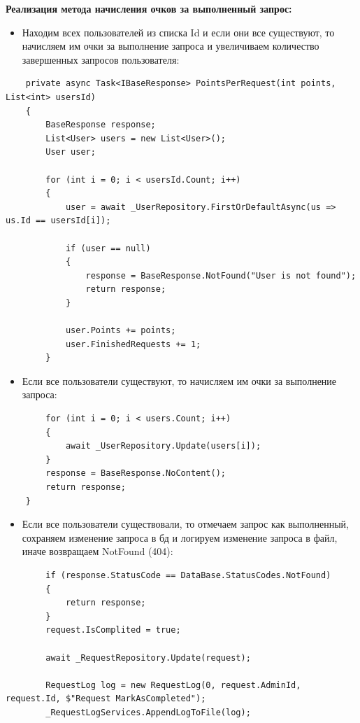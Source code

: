 \textbf{Реализация метода начисления очков за выполненный запрос:}
\begin{itemize}
	\item{Находим всех пользователей из списка Id и если они все существуют, то начисляем им очки за выполнение запроса и увеличиваем количество завершенных запросов пользователя:}
\end{itemize}
\begin{verbatim}
    private async Task<IBaseResponse> PointsPerRequest(int points, List<int> usersId)
    {
        BaseResponse response;
        List<User> users = new List<User>();
        User user;

        for (int i = 0; i < usersId.Count; i++)
        {
            user = await _UserRepository.FirstOrDefaultAsync(us => us.Id == usersId[i]);

            if (user == null)
            {
                response = BaseResponse.NotFound("User is not found");
                return response;
            }

            user.Points += points;
            user.FinishedRequests += 1;
        }
\end{verbatim}

\begin{itemize}
	\item{Если все пользователи существуют, то начисляем им очки за выполнение запроса:}
\end{itemize}
\begin{verbatim}
        for (int i = 0; i < users.Count; i++)
        {
            await _UserRepository.Update(users[i]);
        }
        response = BaseResponse.NoContent();
        return response;
    }
\end{verbatim}

\begin{itemize}
	\item{Если все пользователи существовали, то отмечаем запрос как выполненный, сохраняем изменение запроса в бд и логируем изменение запроса в файл, иначе возвращаем NotFound (404):}
\end{itemize}
\begin{verbatim}
        if (response.StatusCode == DataBase.StatusCodes.NotFound)
        {
            return response;
        }
        request.IsComplited = true;

        await _RequestRepository.Update(request);

        RequestLog log = new RequestLog(0, request.AdminId, request.Id, $"Request MarkAsCompleted");
        _RequestLogServices.AppendLogToFile(log);
\end{verbatim}

